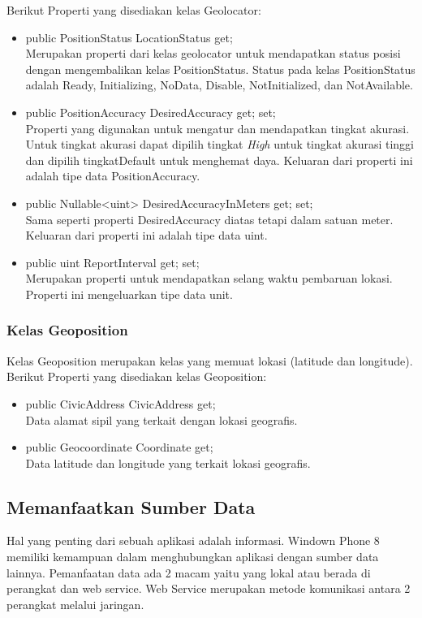 Berikut Properti yang disediakan kelas Geolocator:
\begin{itemize}
	\item public PositionStatus LocationStatus { get; } \\
		Merupakan properti dari kelas geolocator untuk mendapatkan status posisi dengan mengembalikan kelas PositionStatus. Status pada kelas PositionStatus adalah Ready, Initializing, NoData, Disable, NotInitialized, dan NotAvailable.
	\item public PositionAccuracy DesiredAccuracy { get; set; } \\
		Properti yang digunakan untuk mengatur dan mendapatkan tingkat akurasi. Untuk tingkat akurasi dapat dipilih tingkat \textit{High} untuk tingkat akurasi tinggi dan dipilih tingkat{Default} untuk menghemat daya. Keluaran dari properti ini adalah tipe data PositionAccuracy.
	\item public Nullable<uint> DesiredAccuracyInMeters { get; set; }\\
		Sama seperti properti DesiredAccuracy diatas tetapi dalam satuan meter. Keluaran dari properti ini adalah tipe data uint.
	\item public uint ReportInterval { get; set; } \\
		Merupakan properti untuk mendapatkan selang waktu pembaruan lokasi. Properti ini mengeluarkan tipe data unit.
\end{itemize}

\subsubsection{Kelas Geoposition}
\label{subsubsec:Kelas Geoposition}
\hspace{0.5cm} Kelas Geoposition merupakan kelas yang memuat lokasi (latitude dan longitude).
Berikut Properti yang disediakan kelas Geoposition:
\begin{itemize}
	\item public CivicAddress CivicAddress { get; } \\
		Data alamat sipil yang terkait dengan lokasi geografis.
	\item public Geocoordinate Coordinate { get; } \\
		Data latitude dan longitude yang terkait lokasi geografis.
\end{itemize}

\subsection{Memanfaatkan Sumber Data}
\label{subsec:Memanfaatkan Sumber Data}
\hspace{0.5cm} Hal yang penting dari sebuah aplikasi adalah informasi. Windown Phone 8 memiliki kemampuan dalam menghubungkan aplikasi dengan sumber data lainnya. Pemanfaatan data ada 2 macam yaitu yang lokal atau berada di perangkat dan web service. Web Service merupakan metode komunikasi antara 2 perangkat melalui jaringan. 

